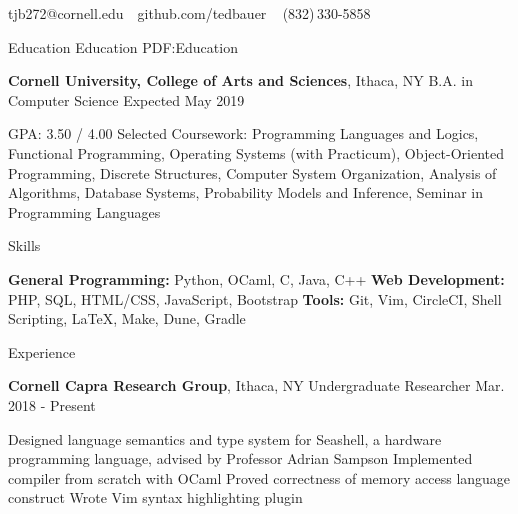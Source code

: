 \documentclass[letterpaper,MMMyyyy,nonstopmode]{simpleresumecv}
\newcommand{\CVAuthor}{Theodore Bauer}
\begin{document}

\Title{\CVAuthor}

\begin{SubTitle}
tjb272@cornell.edu
\,\SubBulletSymbol\,
github.com/tedbauer
\,\SubBulletSymbol\,
\,(832)\,330-5858
\end{SubTitle}

\begin{Body}

\Section
{Education}
{Education}
{PDF:Education}

\Entry
{\textbf{Cornell University, College of Arts and Sciences}},
Ithaca, NY
\Gap
\BulletItem
B.A. in Computer Science
\hfill
Expected May 2019
\begin{Detail}
\SubBulletItem
GPA: 3.50 / 4.00
\SubBulletItem
Selected Coursework: Programming Languages and Logics, Functional Programming, \newline Operating Systems (with Practicum), Object-Oriented Programming, Discrete Structures, \newline Computer System Organization, Analysis of Algorithms, Database Systems, \newline Probability Models and Inference, Seminar in Programming Languages
\end{Detail}


\Section
{Skills}
{}
{}

\textbf{General Programming:} Python, OCaml, C, Java, C++
\Gap
\textbf{Web Development:}  PHP, SQL, HTML/CSS, JavaScript, Bootstrap
\Gap
\textbf{Tools:} Git, Vim, CircleCI, Shell Scripting, \LaTeX, Make, Dune, Gradle

\Section
{Experience}{}{}

\Entry
\textbf{Cornell Capra Research Group}, Ithaca, NY
\Gap
\BulletItem Undergraduate Researcher
\hfill Mar. 2018 - Present

\begin{Detail}
\SubBulletItem Designed language semantics and type system for Seashell, a hardware \newline programming language, advised by Professor Adrian Sampson
\SubBulletItem Implemented compiler from scratch with OCaml
\SubBulletItem Proved correctness of memory access language construct
\SubBulletItem Wrote Vim syntax highlighting plugin

\end{Detail}


\end{Body}
\end{document}
